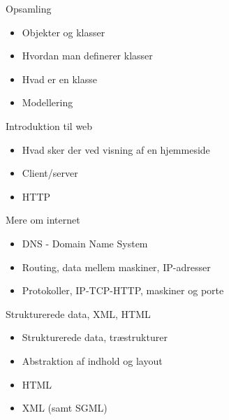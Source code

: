 \documentclass[a4paper,landscape]{slides}
\begin{document}
\begin{slide}
	\begin{center} {\large 
            Opsamling
	} \end{center}
	\begin{itemize} \addtolength{\itemsep}{-\baselineskip}
		\item Objekter og klasser
		\item Hvordan man definerer klasser
                \item Hvad er en klasse
		\item Modellering
	\end{itemize}
\end{slide}

\begin{slide}
	\begin{center} {\large 
            Introduktion til web
	} \end{center}
	\begin{itemize} \addtolength{\itemsep}{-\baselineskip}
                \item Hvad sker der ved visning af en hjemmeside
                \item Client/server
                \item HTTP
	\end{itemize}
\end{slide}


\begin{slide}
	\begin{center} {\large 
            Mere om internet
	} \end{center}
	\begin{itemize} \addtolength{\itemsep}{-\baselineskip}
                \item DNS - Domain Name System
                \item Routing, data mellem maskiner, IP-adresser
                \item Protokoller, IP-TCP-HTTP, maskiner og porte
	\end{itemize}
\end{slide}

\begin{slide}
	\begin{center} {\large 
            Strukturerede data, XML, HTML
	} \end{center}
	\begin{itemize} \addtolength{\itemsep}{-\baselineskip}
                \item Strukturerede data, træstrukturer
                \item Abstraktion af indhold og layout
                \item HTML
                \item XML (samt SGML)
	\end{itemize}
\end{slide}
\end{document}
